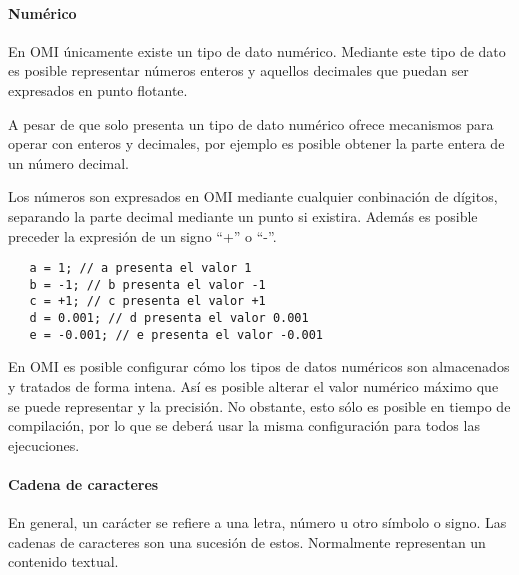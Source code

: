 \paragraph{Numérico}\label{sec:type_num}
En OMI únicamente existe un tipo de dato numérico. Mediante este tipo de dato es posible representar 
números enteros y aquellos decimales que puedan ser expresados en punto flotante. 

A pesar de que solo presenta un tipo de dato numérico ofrece mecanismos para operar con enteros y decimales, por ejemplo es posible obtener la parte entera de 
un número decimal.

Los números son expresados en OMI mediante cualquier conbinación de dígitos, separando la parte decimal mediante un punto si existira. Además es
posible preceder la expresión de un signo ``+'' o ``-''. \\

\begin{lstlisting}
   a = 1; // a presenta el valor 1
   b = -1; // b presenta el valor -1
   c = +1; // c presenta el valor +1
   d = 0.001; // d presenta el valor 0.001
   e = -0.001; // e presenta el valor -0.001
\end{lstlisting}

En OMI es posible configurar cómo los tipos de datos numéricos son almacenados y tratados de forma intena. Así es posible alterar el valor numérico máximo que se puede representar 
y la precisión. No obstante, esto sólo es posible en tiempo de compilación, por lo que se deberá usar la misma configuración para todos las ejecuciones. \\


\paragraph{Cadena de caracteres}\label{sec:type_string}
En general, un carácter se refiere a una letra, número u otro símbolo o signo. Las cadenas de caracteres son una sucesión de estos. Normalmente representan un contenido textual. 

